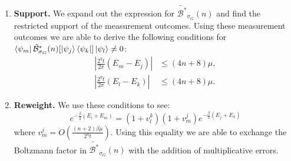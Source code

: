 \documentclass[aps,floatfix,10pt,amssymb,amsfont,amsmath,superscriptaddress,float,nofootinbib,longbibliography,nobalancelastpage,twocolumn]{revtex4-2}
\begin{document}
\begin{enumerate}
    We then perform the same truncation as before, replacing $\mathcal{B}(n)$ with its band-limited version $\tilde{\mathcal{B}}(n)$, and using Lemmas~\ref{lemma:3} and \ref{lemma:composition} to demonstrate:
    \begin{equation}
    \begin{aligned}
    \|\mathcal{B}(n)[\sigma_G] - \tilde{\mathcal{B}}(n)[\sigma_G]\|_* &\leq 24e(2n+3)\epsilon_{\Delta},
    \\ \|\mathcal{B}^*_{\sigma_G}(n)[\mathbb{I}] - \tilde{\mathcal{B}}^*_{\sigma_G}(n)[\mathbb{I}]\|_* &\leq 24e(2n+3)\epsilon_{\Delta}.       
    \end{aligned}
    \label{eq:sumb1}
\end{equation}
\item \textbf{Support.} We expand out the expression for $\tilde{\mathcal{B^*}}_{\sigma_G}(n)$ and find the restricted support of the measurement outcomes. Using these measurement outcomes we are able to derive the following conditions for $\bra{\psi_m}\tilde{\mathcal{B}}^*_{\sigma_G}(n)[\ket{\psi_j}\bra{\psi_k}]\ket{\psi_l} \neq 0$:
\begin{equation}
\begin{aligned}
    \left|\frac{2^{\eta}t}{2\pi}(E_m-E_j)\right|&\leq(4n+8)\mu,\\
    \left|\frac{2^{\eta}t}{2\pi}(E_l-E_k)\right|&\leq(4n+8)\mu.
\end{aligned}
\end{equation}
\item \textbf{Reweight.} We use these conditions to see:
\begin{equation}
    e^{-\frac{\beta}{2}(E_l+E_m)}=(1+v_l^k)(1+v_m^j)e^{-\frac{\beta}{2}(E_j+E_k)}
\end{equation}
where $v_m^j=O(\frac{(n+2)\beta \mu}{2^{\eta}t})$. Using this equality we are able to exchange the Boltzmann factor in $\tilde{\mathcal{B^*}}_{\sigma_G}(n)$ with the addition of multiplicative errors.


\end{enumerate}
\end{document}
